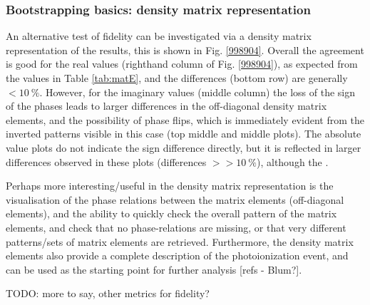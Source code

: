 \subsubsection{Bootstrapping basics: density matrix representation}

An alternative test of fidelity can be investigated via a density matrix representation of the results, this is shown in Fig. \ref{998904}. Overall the agreement is good for the real values (righthand column of Fig. \ref{998904}), as expected from the values in Table \ref{tab:matE}, and the differences (bottom row) are generally $<10~\%$. However, for the imaginary values (middle column) the loss of the sign of the phases leads to larger differences in the off-diagonal density matrix elements, and the possibility of phase flips, which is immediately evident from the inverted patterns visible in this case (top middle and middle plots). The absolute value plots do not indicate the sign difference directly, but it is reflected in larger differences observed in these plots (differences $>>10~\%$), although the .

Perhaps more interesting/useful in the density matrix representation is the visualisation of the phase relations between the matrix elements (off-diagonal elements), and the ability to quickly check the overall pattern of the matrix elements, and check that no phase-relations are missing, or that very different patterns/sets of matrix elements are retrieved. Furthermore, the density matrix elements also provide a complete description of the photoionization event, and can be used as the starting point for further analysis [refs - Blum?].

TODO: more to say, other metrics for fidelity?
